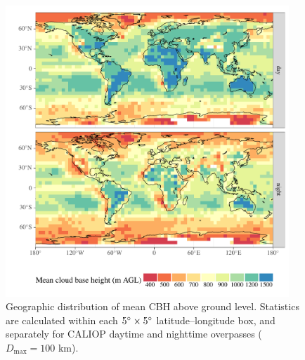 \documentclass[essd,manuscript]{copernicus}\usepackage[]{graphicx}\usepackage[]{color}
\newenvironment{knitrout}{}{} %
\begin{document}
\begin{figure}
  \centering
\begin{knitrout}
\color{fgcolor}

{\centering \includegraphics[width=0.95\textwidth]{figure/method-cbase-base-100-1} 

}



\end{knitrout}
  \caption{Geographic distribution of mean CBH above ground
    level.  Statistics are calculated within each $5^{\circ}\times 5^{\circ}$
    latitude--longitude box, and separately for CALIOP daytime and nighttime
    overpasses ($D_\text{max} = 100$ km).}
  \label{fig:geo}
\end{figure}

\end{document}
